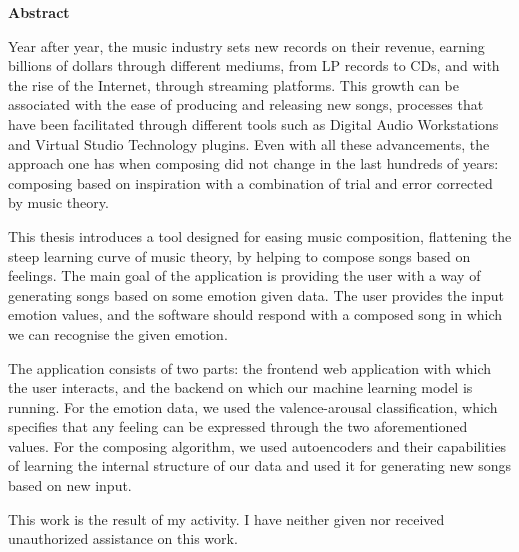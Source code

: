 \thispagestyle{plain}
\begin{center}
    \Large
    \textbf{Abstract}

    \vspace{0.4cm}


\end{center}
Year after year, the music industry sets new records on their revenue,
earning billions of dollars through different mediums,
from LP records to  CDs, and with the rise of the Internet,
through streaming platforms.
This growth can be associated with the ease of producing
and releasing new songs, processes that have been facilitated
through different tools such as Digital Audio Workstations
and Virtual Studio Technology plugins. Even with all these advancements,
the approach one has when composing did not change in the last hundreds of
years: composing based on inspiration with a combination of
trial and error corrected by music theory.

This thesis introduces a tool designed for easing music composition,
flattening the steep learning curve of music theory,
by helping to compose songs based on feelings.
The main goal of the application is providing the user with a way of
generating songs based on some emotion given data.
The user provides the input emotion values,
and the software should respond with a composed song in which we can
recognise the given emotion.

The application consists of two parts:
the frontend web application with which the user interacts,
and the backend on which our machine learning model is running.
For the emotion data, we used the valence-arousal classification,
which specifies that any feeling can be expressed through the two aforementioned
values. For the composing algorithm, we used autoencoders
and their capabilities of learning the internal structure of our
data and used it for generating new songs based on new input.

This work is the result of my activity.
I have neither given nor received unauthorized assistance on this work.
